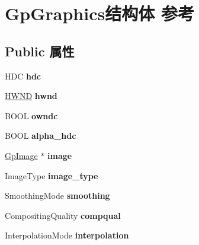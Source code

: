 \hypertarget{struct_gp_graphics}{}\section{Gp\+Graphics结构体 参考}
\label{struct_gp_graphics}
\subsection*{Public 属性}
\begin{DoxyCompactItemize}
\item 
\mbox{\label{struct_gp_graphics_a0dc498b088c9c811d09ba7b7a3beebb9}} 
H\+DC {\bfseries hdc}
\item 
\mbox{\label{struct_gp_graphics_afc4d8ed506fab7e4698ccafcf7561e3d}} 
\hyperlink{interfacevoid}{H\+W\+ND} {\bfseries hwnd}
\item 
\mbox{\label{struct_gp_graphics_a62105adf4e82bfc99f125bc6d062b23a}} 
B\+O\+OL {\bfseries owndc}
\item 
\mbox{\label{struct_gp_graphics_a5cfe6591b8493cd43bebd228e58b81e6}} 
B\+O\+OL {\bfseries alpha\+\_\+hdc}
\item 
\mbox{\label{struct_gp_graphics_aa19414fc1cca7410e590884cd91adb0c}} 
\hyperlink{struct_gp_image}{Gp\+Image} $\ast$ {\bfseries image}
\item 
\mbox{\label{struct_gp_graphics_ad18fb4e711fb0d5bb52868fed2a76482}} 
Image\+Type {\bfseries image\+\_\+type}
\item 
\mbox{\label{struct_gp_graphics_a677c36d7ba7df54a9d44724d539b24da}} 
Smoothing\+Mode {\bfseries smoothing}
\item 
\mbox{\label{struct_gp_graphics_acb98f3c3f89dcef31b0b26f60149790c}} 
Compositing\+Quality {\bfseries compqual}
\item 
\mbox{\label{struct_gp_graphics_aa850dcdd25ae6cdb259ae98cc8005804}} 
Interpolation\+Mode {\bfseries interpolation}
\item 
\mbox{\label{struct_gp_graphics_a5dafec52a6d1c58aa9906fee0bc7841c}} 

\end{DoxyCompactItemize}

